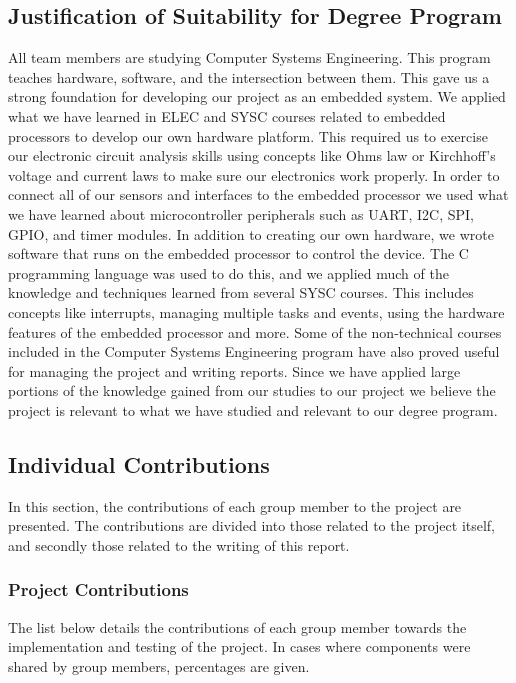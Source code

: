 \subsection{Justification of Suitability for Degree Program}

All team members are studying Computer Systems Engineering.  This program
teaches hardware, software, and the intersection between them.  This gave us a
strong foundation for developing our project as an embedded system.  We
applied what we have learned in ELEC and SYSC courses related to embedded
processors to develop our own hardware platform.  This required us to
exercise our electronic circuit analysis skills using concepts like Ohms law or
Kirchhoff’s voltage and current laws to make sure our electronics work
properly.  In order to connect all of our sensors and interfaces to the
embedded processor we used what we have learned about microcontroller
peripherals such as UART, I2C, SPI, GPIO, and timer modules.  In addition to 
creating our own hardware, we wrote software that runs on the embedded processor
to control the device.  The C programming language was used to do this, and we 
applied much of the knowledge and techniques learned from several SYSC courses.  
This includes concepts like interrupts, managing multiple tasks and events, 
using the hardware features of the embedded processor and more.  Some of the
non-technical courses included in the Computer Systems Engineering program have 
also proved useful for managing the project and writing reports. 
Since we 
have applied large portions of the knowledge gained from our studies to
our project we believe the project is relevant to what we have studied and 
relevant to our degree program.

\subsection{Individual Contributions}
In this section, the contributions of each group member to the project are
presented. The contributions are divided into those related to the project 
itself, and secondly those related to the writing of this report.

\subsubsection{Project Contributions}
The list below details the contributions of each group member towards the
implementation and testing of the project. In cases where components were 
shared by group members, percentages are given.

